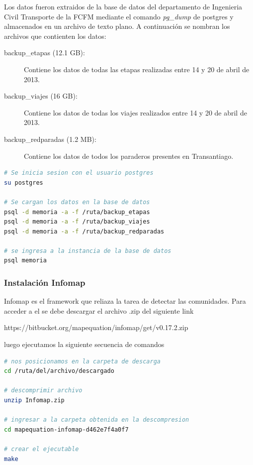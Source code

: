 \documentclass[12pt]{article}
\begin{document}
Los datos fueron extraidos de la base de datos del departamento de Ingenieria Civil Transporte de la FCFM mediante el comando \textit{pg\_dump} de postgres y almacenados en un archivo de texto plano. A continuación se nombran los archivos que contienten los datos:

\begin{description}
	\item[backup\_etapas (12.1 GB):] Contiene los datos de todas las etapas realizadas entre 14 y 20 de abril de 2013.
	\item[backup\_viajes (16 GB):] Contiene los datos de todas los viajes realizados entre 14 y 20 de abril de 2013.
	\item[backup\_redparadas (1.2 MB):] Contiene los datos de todos los paraderos presentes en Transantiago.
\end{description}

\begin{lstlisting}[breaklines=true, 
				   language=bash,  
				   title=asd, 
				   caption=Importacion de datos,
				   label=fig:importar_datos]
# Se inicia sesion con el usuario postgres 
su postgres

# Se cargan los datos en la base de datos
psql -d memoria -a -f /ruta/backup_etapas
psql -d memoria -a -f /ruta/backup_viajes
psql -d memoria -a -f /ruta/backup_redparadas

# se ingresa a la instancia de la base de datos
psql memoria

\end{lstlisting}

		\subsubsection{Instalación Infomap}

Infomap es el framework que reliaza la tarea de detectar las comunidades. Para acceder a el se debe descargar el archivo .zip del siguiente link 

https://bitbucket.org/mapequation/infomap/get/v0.17.2.zip

luego ejecutamos la siguiente secuencia de comandos

\begin{lstlisting}[breaklines=true, 
				   language=sh,  
				   title=asd, 
				   caption=Instalación infomap,
				   label=fig:instalacion_infomap]
# nos posicionamos en la carpeta de descarga
cd /ruta/del/archivo/descargado

# descomprimir archivo
unzip Infomap.zip

# ingresar a la carpeta obtenida en la descompresion
cd mapequation-infomap-d462e7f4a0f7

# crear el ejecutable
make

\end{lstlisting}
\end{document}
